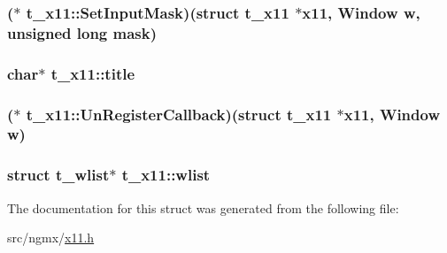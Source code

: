 \hypertarget{structt__x11_a1c49865162e6490abc3ebf34f6c26233}{
\subsubsection[{\-Set\-Input\-Mask}]{($\ast$ {\bf t\-\_\-x11\-::\-Set\-Input\-Mask})(struct {\bf t\-\_\-x11} $\ast$x11, \-Window {\bf w}, unsigned long mask)}}\label{structt__x11_a1c49865162e6490abc3ebf34f6c26233}
\hypertarget{structt__x11_a16992eb651ec694e9075960da372be64}{
\subsubsection[{title}]{\setlength{\rightskip}{0pt plus 5cm}char$\ast$ {\bf t\-\_\-x11\-::title}}}\label{structt__x11_a16992eb651ec694e9075960da372be64}
\hypertarget{structt__x11_ade8d8f2db3ca68085c9fefce5fb58cfb}{
\subsubsection[{\-Un\-Register\-Callback}]{($\ast$ {\bf t\-\_\-x11\-::\-Un\-Register\-Callback})(struct {\bf t\-\_\-x11} $\ast$x11, \-Window {\bf w})}}\label{structt__x11_ade8d8f2db3ca68085c9fefce5fb58cfb}
\hypertarget{structt__x11_ad27334830eb71819cb56bc360f3feac7}{
\subsubsection[{wlist}]{\setlength{\rightskip}{0pt plus 5cm}struct {\bf t\-\_\-wlist}$\ast$ {\bf t\-\_\-x11\-::wlist}}}\label{structt__x11_ad27334830eb71819cb56bc360f3feac7}


\-The documentation for this struct was generated from the following file\-:\begin{DoxyCompactItemize}
\item 
src/ngmx/\hyperlink{x11_8h}{x11.\-h}\end{DoxyCompactItemize}
